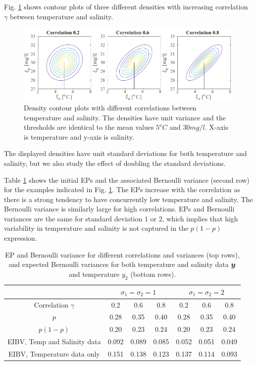 \documentclass[aoas]{imsart}
\begin{document}
Fig. \ref{illus_bivarDens} shows contour plots of three different
densities with increasing correlation $\gamma$ between temperature and
salinity. 
\begin{figure}[h!] \centering
  \includegraphics[width=0.99\textwidth]{Figures/illus_bivar.pdf}
  \caption{Density contour plots with different correlations between
    temperature and salinity. The densities have unit variance and the
    thresholds are identical to the mean values $5^o C$ and
    $30 mg/l$. X-axis is temperature and y-axis is salinity.}
\label{illus_bivarDens}
\end{figure}
The displayed densities have unit standard deviations for both
temperature and salinity, but we also study the effect of doubling the
standard deviations.

Table \ref{tab:sim_rhoab} shows the initial EPs and the associated
Bernoulli variance (second row) for the examples indicated in Fig.
\ref{illus_bivarDens}. The EPs increase with the correlation as there
is a strong tendency to have concurrently low temperature and salinity. The Bernoulli variance is similarly large for high
correlations. EPs and Bernoulli variances are the same for standard
deviation $1$ or $2$, which implies that high variability in
temperature and salinity is not captured in the $p(1-p)$ expression.

\begin{table}[!h] \centering \caption{EP and Bernoulli variance for
    different correlations and variances (top rows), and expected
    Bernoulli variances for both temperature and salinity data ${\boldsymbol y}$ and 
    temperature $y_2$ (bottom rows).}
  \begin{tabular}{c|ccc|ccc}
 &\multicolumn{3}{c}{$\sigma_1=\sigma_2=1$} & \multicolumn{3}{c}{$\sigma_1=\sigma_2=2$} \\
\hline
Correlation $\gamma$ & 0.2 & 0.6 & 0.8 & 0.2 & 0.6 & 0.8 \\
\hline
$p$ & 0.28 & 0.35 & 0.40 & 0.28 & 0.35 & 0.40 \\ 
$p(1-p)$ & 0.20 & 0.23 & 0.24 & 0.20 & 0.23 & 0.24 \\ 
EIBV, Temp and Salinity data & 0.092 & 0.089 & 0.085 & 0.052 & 0.051 & 0.049 \\ 
EIBV, Temperature data only & 0.151 & 0.138 & 0.123 & 0.137 & 0.114 & 0.093 \\ 
\hline
\end{tabular}
\label{tab:sim_rhoab}
\end{table}
\end{document}
